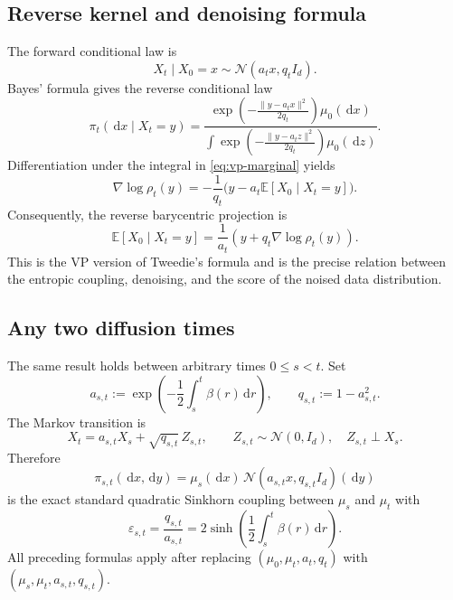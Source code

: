 \documentclass[11pt]{article}
\theoremstyle{remark}
\newcommand{\E}{\mathbb{E}}
\newcommand{\N}{\mathcal{N}}
\newcommand{\dd}{\,\mathrm{d}}
\begin{document}
\subsection{Reverse kernel and denoising formula}

The forward conditional law is
\[
  X_t\mid X_0=x\sim\N(a_tx,q_tI_d).
\]
Bayes' formula gives the reverse conditional law
\begin{equation}
  \label{eq:reverse-kernel}
  \boxed{\quad
  \pi_t(\dd x\mid X_t=y)
  =\frac{
    \exp\!\left(-\frac{\lVert y-a_tx\rVert^2}{2q_t}\right)\mu_0(\dd x)
  }{
    \displaystyle\int
    \exp\!\left(-\frac{\lVert y-a_tz\rVert^2}{2q_t}\right)\mu_0(\dd z)
  }.
  \quad}
\end{equation}
Differentiation under the integral in \eqref{eq:vp-marginal} yields
\begin{equation}
  \nabla\log\rho_t(y)
  =-\frac{1}{q_t}\bigl(y-a_t\E[X_0\mid X_t=y]\bigr).
\end{equation}
Consequently, the reverse barycentric projection is
\begin{equation}
  \label{eq:vp-tweedie}
  \boxed{\quad
  \E[X_0\mid X_t=y]
  =\frac1{a_t}\left(y+q_t\nabla\log\rho_t(y)\right).
  \quad}
\end{equation}
This is the VP version of Tweedie's formula and is the precise relation
between the entropic coupling, denoising, and the score of the noised data
distribution.

\subsection{Any two diffusion times}

The same result holds between arbitrary times $0\le s<t$.  Set
\begin{equation}
  \label{eq:ast-qst}
  a_{s,t}:=\exp\!\left(-\frac12\int_s^t\beta(r)\dd r\right),
  \qquad
  q_{s,t}:=1-a_{s,t}^2.
\end{equation}
The Markov transition is
\[
  X_t=a_{s,t}X_s+\sqrt{q_{s,t}}\,Z_{s,t},
  \qquad Z_{s,t}\sim\N(0,I_d),\quad Z_{s,t}\perp X_s.
\]
Therefore
\begin{equation}
  \label{eq:two-time-coupling}
  \pi_{s,t}(\dd x,\dd y)
  =\mu_s(\dd x)\,\N(a_{s,t}x,q_{s,t}I_d)(\dd y)
\end{equation}
is the exact standard quadratic Sinkhorn coupling between $\mu_s$ and $\mu_t$
with
\begin{equation}
  \label{eq:epsilon-st}
  \boxed{\quad
  \varepsilon_{s,t}=\frac{q_{s,t}}{a_{s,t}}
  =2\sinh\!\left(\frac12\int_s^t\beta(r)\dd r\right).
  \quad}
\end{equation}
All preceding formulas apply after replacing
$(\mu_0,\mu_t,a_t,q_t)$ with
$(\mu_s,\mu_t,a_{s,t},q_{s,t})$.
\end{document}
